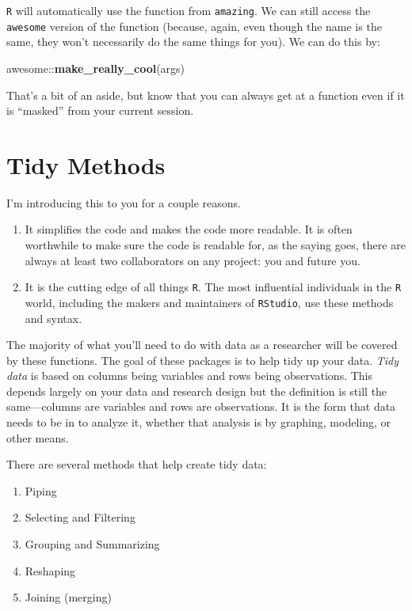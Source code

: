 \documentclass[]{tufte-book}
\newenvironment{Shaded}{}{}
\newcommand{\KeywordTok}[1]{\textcolor[rgb]{0.00,0.44,0.13}{\textbf{#1}}}
\newcommand{\OperatorTok}[1]{\textcolor[rgb]{0.40,0.40,0.40}{#1}}
\newcommand{\NormalTok}[1]{#1}
\providecommand{\tightlist}{%
  \setlength{\itemsep}{0pt}\setlength{\parskip}{0pt}}
\theoremstyle{definition}
\theoremstyle{definition}
\theoremstyle{remark}
\begin{document}
\texttt{R} will automatically use the function from \texttt{amazing}. We
can still access the \texttt{awesome} version of the function (because,
again, even though the name is the same, they won't necessarily do the
same things for you). We can do this by:

\begin{Shaded}
\begin{Highlighting}[]
\NormalTok{awesome}\OperatorTok{::}\KeywordTok{make_really_cool}\NormalTok{(args)}
\end{Highlighting}
\end{Shaded}

That's a bit of an aside, but know that you can always get at a function
even if it is ``masked'' from your current session.

\section*{Tidy Methods}\label{tidy-methods}

I'm introducing this to you for a couple reasons.

\begin{enumerate}
\def\labelenumi{\arabic{enumi}.}
\tightlist
\item
  It simplifies the code and makes the code more readable. It is often
  worthwhile to make sure the code is readable for, as the saying goes,
  there are always at least two collaborators on any project: you and
  future you.
\item
  It is the cutting edge of all things \texttt{R}. The most influential
  individuals in the \texttt{R} world, including the makers and
  maintainers of \texttt{RStudio}, use these methods and syntax.
\end{enumerate}

The majority of what you'll need to do with data as a researcher will be
covered by these functions. The goal of these packages is to help tidy
up your data. \emph{Tidy data} is based on columns being variables and
rows being observations. This depends largely on your data and research
design but the definition is still the same---columns are variables and
rows are observations. It is the form that data needs to be in to
analyze it, whether that analysis is by graphing, modeling, or other
means.

There are several methods that help create tidy data:

\begin{enumerate}
\def\labelenumi{\arabic{enumi}.}
\tightlist
\item
  Piping
\item
  Selecting and Filtering
\item
  Grouping and Summarizing
\item
  Reshaping
\item
  Joining (merging)
\end{enumerate}
\end{document}
